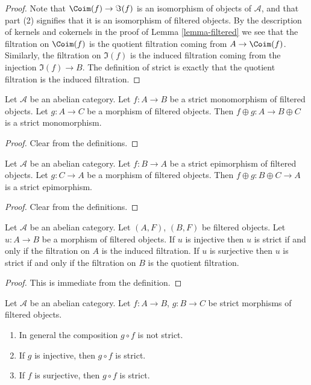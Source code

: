 \begin{proof}
Note that $\Coim(f) \to \Im(f)$ is an isomorphism of
objects of $\mathcal{A}$, and that part (2) signifies that it is
an isomorphism of filtered objects.
By the description of kernels and cokernels in the proof of
Lemma \ref{lemma-filtered}
we see that the filtration on $\Coim(f)$ is the
quotient filtration coming from $A \to \Coim(f)$.
Similarly, the filtration on $\Im(f)$ is the induced
filtration coming from the injection $\Im(f) \to B$.
The definition of strict is exactly that the quotient filtration
is the induced filtration.
\end{proof}

\begin{lemma}
\label{lemma-add-summand-strict-monomorphism}
Let $\mathcal{A}$ be an abelian category.
Let $f : A \to B$ be a strict monomorphism of filtered objects.
Let $g : A \to C$ be a morphism of filtered objects.
Then $f \oplus g : A \to B \oplus C$ is a strict monomorphism.
\end{lemma}

\begin{proof}
Clear from the definitions.
\end{proof}

\begin{lemma}
\label{lemma-add-summand-strict-epimorphism}
Let $\mathcal{A}$ be an abelian category.
Let $f : B \to A$ be a strict epimorphism of filtered objects.
Let $g : C \to A$ be a morphism of filtered objects.
Then $f \oplus g : B \oplus C \to A$ is a strict epimorphism.
\end{lemma}

\begin{proof}
Clear from the definitions.
\end{proof}

\begin{lemma}
\label{lemma-induced-and-quotient-strict}
Let $\mathcal{A}$ be an abelian category.
Let $(A, F)$, $(B, F)$ be filtered objects.
Let $u : A \to B$ be a morphism of filtered objects.
If $u$ is injective then $u$ is strict if and only if the filtration
on $A$ is the induced filtration.
If $u$ is surjective then $u$ is strict if and only if the filtration
on $B$ is the quotient filtration.
\end{lemma}

\begin{proof}
This is immediate from the definition.
\end{proof}

\begin{lemma}
\label{lemma-composition-strict}
Let $\mathcal{A}$ be an abelian category. Let $f : A \to B$, $g : B \to C$
be strict morphisms of filtered objects.
\begin{enumerate}
\item In general the composition $g \circ f$ is not strict.
\item If $g$ is injective, then $g \circ f$ is strict.
\item If $f$ is surjective, then $g \circ f$ is strict.
\end{enumerate}
\end{lemma}


